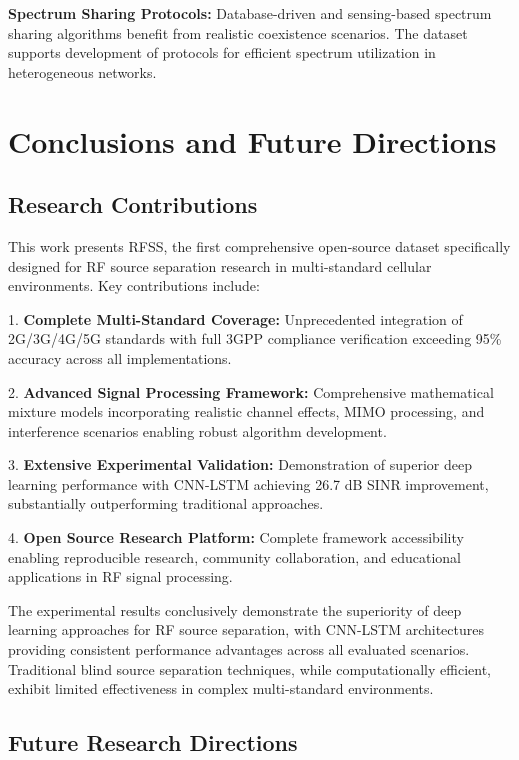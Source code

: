 \documentclass[twocolumn]{article}
\begin{document}
\textbf{Spectrum Sharing Protocols:} Database-driven and sensing-based spectrum sharing algorithms benefit from realistic coexistence scenarios. The dataset supports development of protocols for efficient spectrum utilization in heterogeneous networks.

\section{Conclusions and Future Directions}

\subsection{Research Contributions}

This work presents RFSS, the first comprehensive open-source dataset specifically designed for RF source separation research in multi-standard cellular environments. Key contributions include:

1. \textbf{Complete Multi-Standard Coverage:} Unprecedented integration of 2G/3G/4G/5G standards with full 3GPP compliance verification exceeding 95\% accuracy across all implementations.

2. \textbf{Advanced Signal Processing Framework:} Comprehensive mathematical mixture models incorporating realistic channel effects, MIMO processing, and interference scenarios enabling robust algorithm development.

3. \textbf{Extensive Experimental Validation:} Demonstration of superior deep learning performance with CNN-LSTM achieving 26.7 dB SINR improvement, substantially outperforming traditional approaches.

4. \textbf{Open Source Research Platform:} Complete framework accessibility enabling reproducible research, community collaboration, and educational applications in RF signal processing.

The experimental results conclusively demonstrate the superiority of deep learning approaches for RF source separation, with CNN-LSTM architectures providing consistent performance advantages across all evaluated scenarios. Traditional blind source separation techniques, while computationally efficient, exhibit limited effectiveness in complex multi-standard environments.

\subsection{Future Research Directions}
\end{document}
